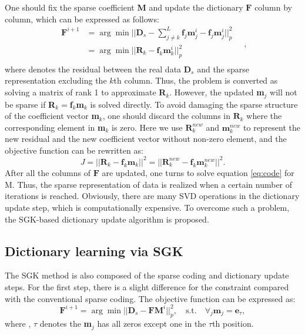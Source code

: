 One should fix the sparse coefficient \textbf{M} and update the dictionary $\mathbf{F}$ column by column, which can be expressed as follows:
\begin{equation}
\begin{split}
	\mathbf{F}^{i+1}		&=\arg\min||\textbf{D}_{s}-\sum_{j\neq k}^{L}\textbf{f}_{j}\textbf{m}^{i}_{j}-\textbf{f}_{j}\textbf{m}^{i}_{j}||^{2}_{p}\\
	&=\arg\min||\textbf{R}_{k}-\textbf{f}_{k}\textbf{m}^{i}_{k}||^{2}_{p}\\
\end{split}
\quad ,
\end{equation}
where  denotes the residual between the real data $\textbf{D}_s$ and the sparse representation excluding the $k$th column. Thus, the problem is converted as solving a matrix of rank 1 to approximate \textbf{R}$_{k}$. However, the updated \textbf{m}$_{j}$ will not be sparse if \textbf{R}$_{k}=$\textbf{f}$_{k}$\textbf{m}$_{k}$ is solved directly. To avoid damaging the sparse structure of the coefficient vector \textbf{m}$_{k}$, one should discard the columns in $\textbf{R}_{k}$ where the corresponding element in \textbf{m}$_{k}$ is zero. Here we use $\textbf{R}^{new}_{k}$ and $\textbf{m}_{k}^{new}$ to represent the new residual and the new coefficient vector without non-zero element, and the objective function can be rewritten as:
\begin{equation}
J=||\textbf{R}_{k}-\textbf{f}_{k}\textbf{m}_k||^{2}=||\textbf{R}_{k}^{new}-\textbf{f}_{k}\textbf{m}^{new}_k||^{2}.
\end{equation}
After all the columns of $\mathbf{F}$ are updated, one turns to solve equation \ref{eq:code} for M. Thus, the sparse representation of data is realized when a certain number of iterations is reached. Obviously, there are many SVD operations in the dictionary update step, which is computationally expensive. To overcome such a problem, the SGK-based dictionary update algorithm is proposed. 

\subsection{Dictionary learning via SGK}
The SGK method \cite[]{sahoo2013dictionary,yangkang2020sgk} is also composed of the sparse coding and dictionary update steps. 
 For the first step, there is a slight difference for the constraint compared with the conventional sparse coding. The objective function can be expressed as:
\begin{equation}
\label{eq:sgk1}
\mathbf{F}^{i+1}=\arg\min||\textbf{D}_s-\mathbf{F}\textbf{M}^{i}||^{2}_{p}, \quad\text{s.t.}  \quad \forall_{j}\textbf{m}_{j}=\textbf{e}_{\tau},
\end{equation}
where , $\tau$ denotes the \textbf{m}$_{j}$ has all zeros except one in the $\tau$th position. 

